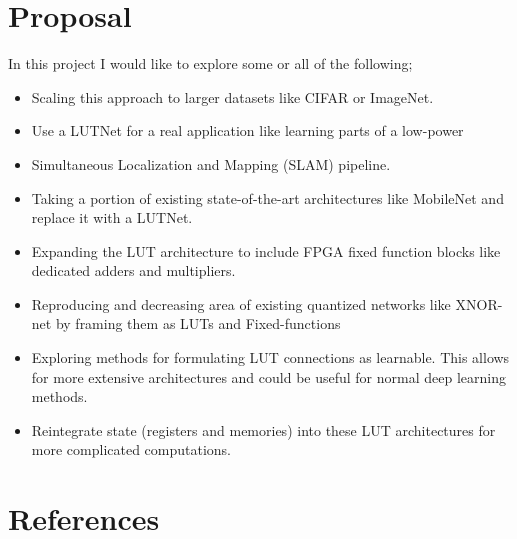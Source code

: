 \documentclass{article}
\begin{document}
\section{Proposal}
In this project I would like to explore some or all of the following;
\begin{itemize}
\item Scaling this approach to larger datasets like CIFAR or ImageNet.
\item Use a LUTNet for a real application like learning parts of a low-power
\item Simultaneous Localization and Mapping (SLAM) pipeline.
\item Taking a portion of existing state-of-the-art architectures like MobileNet and replace it with a LUTNet.
\item Expanding the LUT architecture to include FPGA fixed function blocks like dedicated adders and multipliers. 
\item Reproducing and decreasing area of existing quantized networks like XNOR-net by framing them as LUTs and Fixed-functions
\item Exploring methods for formulating LUT connections as learnable. This allows for more extensive architectures and could be useful for normal deep learning methods. 
\item Reintegrate state (registers and memories) into these LUT architectures for more complicated computations. 
\end{itemize}


\section*{References}

\medskip



%
%
%




%
%
%
\end{document}
